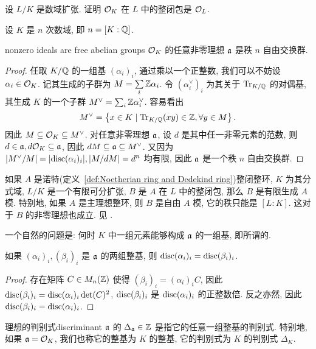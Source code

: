 \begin{exercise}
设 $L/K$ 是数域扩张. 证明 ${\mathcal{O}}_K$ 在 $L$ 中的整闭包是 ${\mathcal{O}}_L$.
\end{exercise}

设 $K$ 是 $n$ 次数域, 即 $n=[K:{\mathbb{Q}}]$.
\begin{theorem}{}{nonzero ideals are free abelian groups}
${\mathcal{O}}_K$ 的任意非零理想 ${\mathfrak{a}}$ 是秩 $n$ 自由交换群.
\end{theorem}
\begin{proof}
任取 $K/{\mathbb{Q}}$ 的一组基 $(\alpha_i)_i$, 通过乘以一个正整数, 我们可以不妨设 $\alpha_i\in{\mathcal{O}}_K$. 记其生成的子群为 $M=\sum\limits_i {\mathbb{Z}}\alpha_i$. 令 $(\alpha_i^\vee)_i$ 为其关于 ${\mathrm{Tr}}_{K/{\mathbb{Q}}}$ 的对偶基, 其生成 $K$ 的一个子群 $M^\vee=\sum_i {\mathbb{Z}}\alpha_i^\vee$. 容易看出
	\[M^\vee=\left\{x\in K\mid {\mathrm{Tr}}_{K/{\mathbb{Q}}}(xy)\in{\mathbb{Z}},\forall y\in M\right\}.\]
因此 $M\subseteq {\mathcal{O}}_K\subseteq M^\vee$. 对任意非零理想 ${\mathfrak{a}}$, 设 $d$ 是其中任一非零元素的范数, 则 $d\in {\mathfrak{a}},d{\mathcal{O}}_K\subseteq {\mathfrak{a}}$, 因此 $dM\subseteq {\mathfrak{a}}\subseteq M^\vee$. 又因为 $|M^\vee/M|=|{\mathrm{disc}}(\alpha_i)_i|,|M/dM|=d^n$ 均有限, 因此 ${\mathfrak{a}}$ 是一个秩 $n$ 自由交换群.
\end{proof}

\begin{remark}\label{rem:integral_closure_over_pid_admits_basis}
如果 $A$ 是诺特(定义~\ref{def:Noetherian ring and Dedekind ring})整闭整环, $K$ 为其分式域, $L/K$ 是一个有限可分扩张, $B$ 是 $A$ 在 $L$ 中的整闭包, 那么 $B$ 是有限生成 $A$ 模. 特别地, 如果 $A$ 是主理想整环, 则 $B$ 是自由 $A$ 模, 它的秩只能是 $[L:K]$. 这对于 $B$ 的非零理想也成立. 见 \cite[I \S2, Theorem~1]{Lang1994}.
\end{remark}

一个自然的问题是: 何时 $K$ 中一组元素能够构成 ${\mathfrak{a}}$ 的一组基, 即所谓的.

\begin{proposition}{}{}
如果 $(\alpha_i)_i,(\beta_i)_i$ 是 ${\mathfrak{a}}$ 的两组整基, 则 ${\mathrm{disc}}(\alpha_i)_i={\mathrm{disc}}(\beta_i)_i$.
\end{proposition}
\begin{proof}
存在矩阵 $C\in M_n({\mathbb{Z}})$ 使得 $(\beta_i)_i=(\alpha_i)_i C$, 因此 ${\mathrm{disc}}(\beta_i)_i={\mathrm{disc}}(\alpha_i)_i\det(C)^2$, ${\mathrm{disc}}(\beta_i)_i$ 是 ${\mathrm{disc}}(\alpha_i)_i$ 的正整数倍. 反之亦然, 因此 ${\mathrm{disc}}(\beta_i)_i={\mathrm{disc}}(\alpha_i)_i$.
\end{proof}

\begin{definition}{理想的判别式}{discriminant}
${\mathfrak{a}}$ 的 $\Delta_{\mathfrak{a}}\in{\mathbb{Z}}$ 是指它的任意一组整基的判别式. 特别地, 如果 ${\mathfrak{a}}={\mathcal{O}}_K$, 我们也称它的整基为 $K$ 的整基, 它的判别式为 $K$ 的判别式 $\Delta_K$.
\end{definition}

